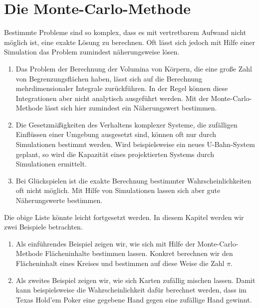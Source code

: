 \chapter[Monte-Carlo Method]{Die Monte-Carlo-Methode}
Bestimmte Probleme sind so komplex, dass es mit vertretbarem Aufwand nicht m\"oglich ist, eine exakte L\"osung zu
berechnen.  Oft l\"asst sich jedoch mit Hilfe einer Simulation das Problem zumindest n\"aherungsweise l\"osen.  
\begin{enumerate}
\item Das Problem der Berechnung der Volumina von K\"orpern, die eine gro\ss{}e Zahl von Begrenzungsfl\"achen haben,
      l\"asst sich auf die Berechnung mehrdimensionaler Integrale zur\"uckf\"uhren.  In der Regel k\"onnen diese
      Integrationen aber nicht analytisch ausgef\"uhrt werden.   Mit der Monte-Carlo-Methode l\"asst sich hier
      zumindest ein N\"aherungswert bestimmen.
\item Die Gesetzm\"a\ss{}igkeiten des Verhaltens komplexer Systeme, die zuf\"alligen Ein\-fl\"ussen einer Umgebung
      ausgesetzt sind, k\"onnen oft nur durch Simulationen bestimmt werden.  Wird beispielsweise ein neues
      U-Bahn-System geplant, so wird die Kapazit\"at eines projektierten Systems durch Simulationen ermittelt.
\item Bei Gl\"uckspielen ist die exakte Berechnung bestimmter Wahrscheinlichkeiten oft nicht m\"oglich.
      Mit Hilfe von Simulationen lassen sich aber gute N\"aherungs\-werte bestimmen.  
\end{enumerate}
Die obige Liste k\"onnte leicht fortgesetzt werden.  In diesem Kapitel werden wir zwei Beispiele betrachten.
\begin{enumerate}
\item Als einf\"uhrendes Beispiel zeigen wir, wie sich mit Hilfe der Monte-Carlo-Methode Fl\"acheninhalte bestimmen
      lassen.  Konkret berechnen wir den Fl\"a\-cheninhalt eines Kreises und bestimmen auf diese Weise
      die Zahl $\pi$.
\item Als zweites Beispiel zeigen wir, wie sich Karten zuf\"allig mischen lassen.
      Damit kann beispielsweise die Wahrscheinlichkeit daf\"ur berechnet werden, dass im Texas Hold'em Poker eine
      gegebene Hand gegen eine zuf\"allige Hand gewinnt.
\end{enumerate}

